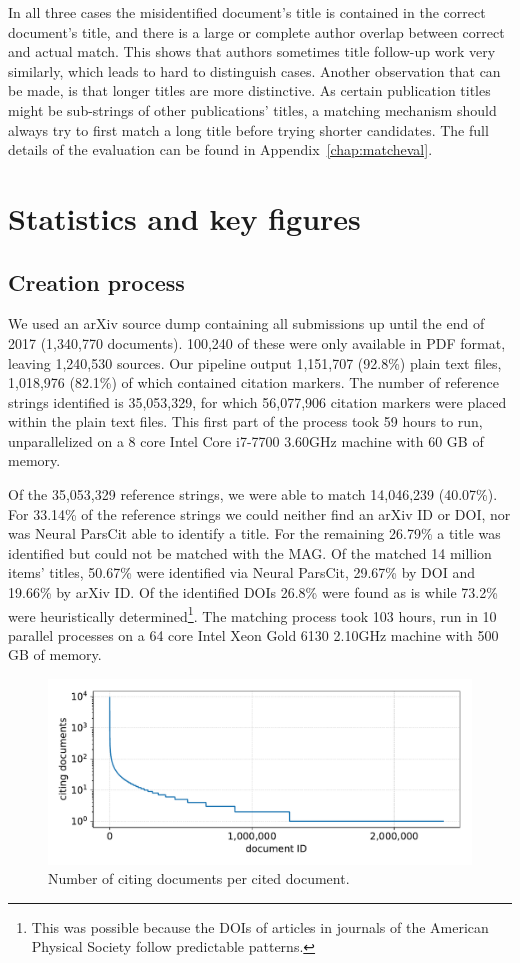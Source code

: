 In all three cases the misidentified document’s title is contained in the correct document’s title, and there is a large or complete author overlap between correct and actual match. This shows that authors sometimes title follow-up work very similarly, which leads to hard to distinguish cases. Another observation that can be made, is that longer titles are more distinctive. As certain publication titles might be sub-strings of other publications' titles, a matching mechanism should always try to first match a long title before trying shorter candidates. The full details of the evaluation can be found in Appendix~\ref{chap:matcheval}.

\section{Statistics and key figures}

\subsection{Creation process}
We used an arXiv source dump containing all submissions up until the end of 2017 (1,340,770 documents). 100,240 of these were only available in PDF format, leaving 1,240,530 sources. Our pipeline output 1,151,707 (92.8\%) plain text files, 1,018,976 (82.1\%) of which contained citation markers. The number of reference strings identified is 35,053,329, for which 56,077,906 citation markers were placed within the plain text files. This first part of the process took 59 hours to run, unparallelized on a 8 core Intel Core i7-7700 3.60GHz machine with 60 GB of memory.

Of the 35,053,329 reference strings, we were able to match 14,046,239 (40.07\%). For 33.14\% of the reference strings we could neither find an arXiv ID or DOI, nor was Neural ParsCit able to identify a title. For the remaining 26.79\% a title was identified but could not be matched with the MAG. Of the matched 14 million items' titles, 50.67\% were identified via Neural ParsCit, 29.67\% by DOI and 19.66\% by arXiv ID. Of the identified DOIs 26.8\% were found as is while 73.2\% were heuristically determined\footnote{This was possible because the DOIs of articles in journals of the American Physical Society follow predictable patterns.}. The matching process took 103 hours, run in 10 parallel processes on a 64 core Intel Xeon Gold 6130 2.10GHz machine with 500 GB of memory.

\begin{figure}
  \centering
  \includegraphics[width=0.8\linewidth]{figures/dataset/citing_docs_per_cited_doc.pdf}
  \caption{Number of citing documents per cited document.}
  \label{fig:numcitdoc}
\end{figure}

